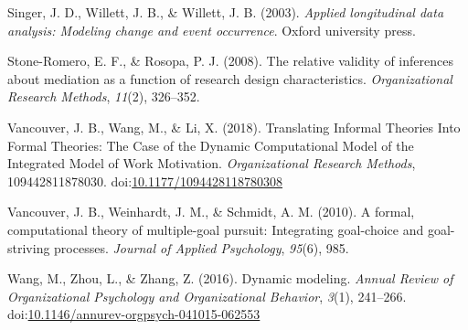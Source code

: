 \documentclass[english,,man]{apa6}
\theoremstyle{definition}
\theoremstyle{definition}
\theoremstyle{definition}
\theoremstyle{remark}
\begin{document}
\leavevmode\hypertarget{ref-singer_applied_2003}{}%
Singer, J. D., Willett, J. B., \& Willett, J. B. (2003). \emph{Applied
longitudinal data analysis: Modeling change and event occurrence}.
Oxford university press.

\leavevmode\hypertarget{ref-stone2008relative}{}%
Stone-Romero, E. F., \& Rosopa, P. J. (2008). The relative validity of
inferences about mediation as a function of research design
characteristics. \emph{Organizational Research Methods}, \emph{11}(2),
326--352.

\leavevmode\hypertarget{ref-vancouver_translating_2018}{}%
Vancouver, J. B., Wang, M., \& Li, X. (2018). Translating Informal
Theories Into Formal Theories: The Case of the Dynamic Computational
Model of the Integrated Model of Work Motivation. \emph{Organizational
Research Methods}, 109442811878030.
doi:\href{https://doi.org/10.1177/1094428118780308}{10.1177/1094428118780308}

\leavevmode\hypertarget{ref-vancouver2010formal}{}%
Vancouver, J. B., Weinhardt, J. M., \& Schmidt, A. M. (2010). A formal,
computational theory of multiple-goal pursuit: Integrating goal-choice
and goal-striving processes. \emph{Journal of Applied Psychology},
\emph{95}(6), 985.

\leavevmode\hypertarget{ref-Wang2016}{}%
Wang, M., Zhou, L., \& Zhang, Z. (2016). Dynamic modeling. \emph{Annual
Review of Organizational Psychology and Organizational Behavior},
\emph{3}(1), 241--266.
doi:\href{https://doi.org/10.1146/annurev-orgpsych-041015-062553}{10.1146/annurev-orgpsych-041015-062553}
\end{document}
